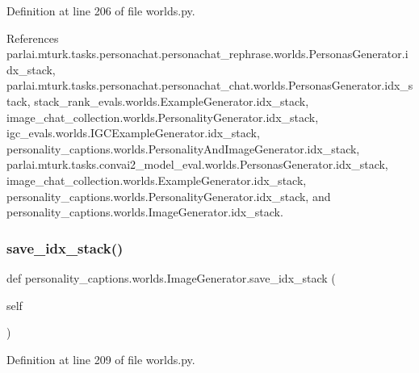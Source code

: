 Definition at line 206 of file worlds.\+py.



References parlai.\+mturk.\+tasks.\+personachat.\+personachat\+\_\+rephrase.\+worlds.\+Personas\+Generator.\+idx\+\_\+stack, parlai.\+mturk.\+tasks.\+personachat.\+personachat\+\_\+chat.\+worlds.\+Personas\+Generator.\+idx\+\_\+stack, stack\+\_\+rank\+\_\+evals.\+worlds.\+Example\+Generator.\+idx\+\_\+stack, image\+\_\+chat\+\_\+collection.\+worlds.\+Personality\+Generator.\+idx\+\_\+stack, igc\+\_\+evals.\+worlds.\+I\+G\+C\+Example\+Generator.\+idx\+\_\+stack, personality\+\_\+captions.\+worlds.\+Personality\+And\+Image\+Generator.\+idx\+\_\+stack, parlai.\+mturk.\+tasks.\+convai2\+\_\+model\+\_\+eval.\+worlds.\+Personas\+Generator.\+idx\+\_\+stack, image\+\_\+chat\+\_\+collection.\+worlds.\+Example\+Generator.\+idx\+\_\+stack, personality\+\_\+captions.\+worlds.\+Personality\+Generator.\+idx\+\_\+stack, and personality\+\_\+captions.\+worlds.\+Image\+Generator.\+idx\+\_\+stack.

\mbox{\label{classpersonality__captions_1_1worlds_1_1ImageGenerator_a1a62516fa0aad79a400d8824f7353d42}} 
\subsubsection{\texorpdfstring{save\+\_\+idx\+\_\+stack()}{save\_idx\_stack()}}
{\footnotesize\ttfamily def personality\+\_\+captions.\+worlds.\+Image\+Generator.\+save\+\_\+idx\+\_\+stack (\begin{DoxyParamCaption}\item[{}]{self }\end{DoxyParamCaption})}



Definition at line 209 of file worlds.\+py.



